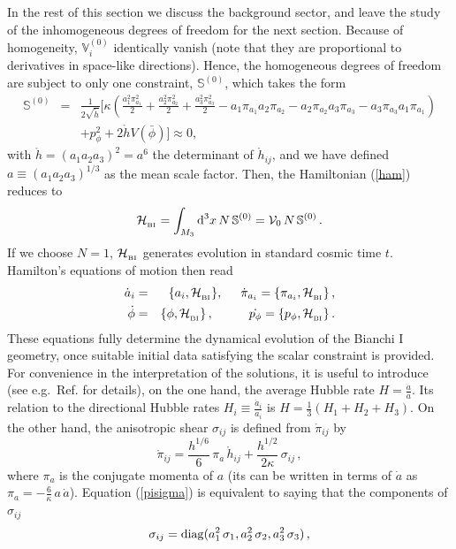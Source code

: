 \documentclass[11pt,tightenlines,eqsecnum,floats,aps,amsmath,amssymb,nofootinbib,prd,floatfix]{revtex4}
\def\f{\frac}
\def\d{\textrm{d}}
\def\pp{p_{\phi}}
\def\pz{\mathring{\pi}}
\newcommand{\be}{\nopagebreak[3]\begin{equation}}
\newcommand{\ee}{\end{equation}}
\def\hz{\mathring{h}}
\def\l{\left}
\def\r{\right}
\newcommand{\bea}{\nopagebreak[3]\begin{eqnarray}}
\newcommand{\ea}{\end{eqnarray}}
\newcommand{\<}{\langle}
\renewcommand{\>}{\rangle}
\begin{document}
In the rest of this section we  discuss the background sector, and leave the study of the inhomogeneous degrees of freedom for the next section. Because of homogeneity,  $\mathbb V_i^{(0)}$ identically vanish (note that they are proportional to derivatives in space-like directions). Hence, the homogeneous degrees of freedom are subject to only one constraint, $\mathbb S^{(0)}$, which takes the form 
%
\bea  \label{Fcons} \mathbb S^{(0)}&=& \f{1}{2\sqrt{\hz}} \biggl[ 
 \kappa \l( \f{a_1^2 \pi_{a_1}^2}{2} + \f{a_2^2 \pi_{a_2}^2}{2}  + \f{a_3^2 \pi_{a_3}^2}{2} 
 - a_1 \pi_{a_1} a_2 \pi_{a_2} - a_2 \pi_{a_2} a_3 \pi_{a_3} - a_3 \pi_{a_3} a_1 \pi_{a_1} \r)\nonumber\\
 && + p_{\phi}^2 + 2 \hz V(\bar{\phi}) \biggr] \approx 0,
\ea%
%
with  $\hz=(a_1a_2a_3)^2=a^6$ the determinant of $\hz_{ij}$, and we have defined $a\equiv (a_1a_2a_3)^{1/3}$ as the mean scale factor. Then, the Hamiltonian (\ref{ham})  reduces to
%
\be \label{backH0} \mathcal H_{_{\rm BI}}=\int_{M_3} \d^3x \, N \, \mathbb S ^{(0)}=\mathcal{V}_0\, N \, \mathbb S ^{(0)}\, .
\ee
If we choose $N=1$, $\mathcal H_{_{\rm BI}}$ generates evolution in standard cosmic time $t$. Hamilton's equations of motion then read 
% 
\bea \label{eoma} \dot a_i&=&\{a_i, \mathcal H_{_{\rm BI}}\} ,\hspace{0.5cm} \dot \pi_{a_i}=\{\pi_{a_i}, \mathcal H_{_{\rm BI}}\} \, , \\ \nonumber 
%
\label{eomphi} \dot \phi&=&\{\phi, \mathcal H_{_{\rm BI}}\} \, , \hspace{1cm} \dot{\pp}=\{\pp, \mathcal H_{_{\rm BI}}\} \, .\ea
These equations  fully determine the dynamical evolution of the Bianchi I geometry, once suitable initial data satisfying the scalar constraint is provided. For convenience in the interpretation of the solutions, it is useful to introduce (see e.g.\ Ref. \cite{aos} for details), on the one hand, the average Hubble rate $H=\frac{\dot a}{a}$. Its relation  to the directional Hubble rates $H_i\equiv \frac{\dot a_i}{a_i}$ is  $H = \frac{1}{3}\left(H_1+H_2+H_3\right)$. On the other hand, the anisotropic shear $\sigma_{ij}$ is defined from $\pz_{ij}$ by
%
\be\label{pisigma}  \pz_{ij}= \frac{h^{1/6}}{6}\, \pi_a\,  \hz_{ij}+\frac{h^{1/2}}{2\kappa}\, \sigma_{ij} \, , \ee  
%
where $\pi_a$ is the conjugate momenta of $a$ (its can be written in terms of  $\dot a$ as $\pi_a=-\frac{6}{\kappa}\, a \, \dot a$). Equation (\ref{pisigma}) is equivalent to saying that the components of $\sigma_{ij}$
\be \sigma_{ij}={\rm diag}(a_1^2\, \sigma_1,a_2^2\, \sigma_2,a_3^2\, \sigma_3)\, ,\ee
\end{document}
